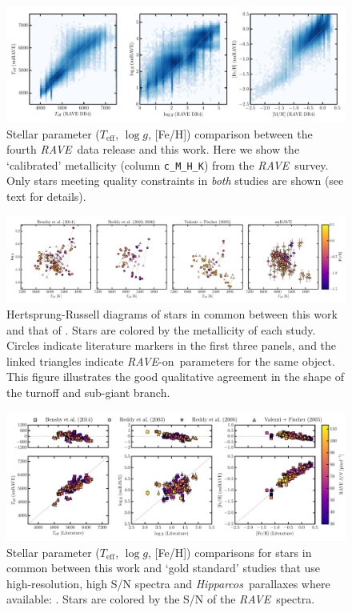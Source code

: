 \documentclass[preprint]{aastex}
\newcommand{\acronym}[1]{{\small{#1}}}
\newcommand{\project}[1]{\textsl{#1}}
\newcommand{\rave}{\project{\acronym{RAVE}}}
\newcommand{\hipparcos}{\project{Hipparcos}}
\newcommand{\raveon}{\rave-on}
\newcommand{\teff}{T_{\mathrm{eff}}}
\newcommand{\logg}{\log g}
\begin{document}
\begin{figure}[p]
\includegraphics[width=\textwidth]{figures/dr4-comparison.pdf}
\caption{Stellar parameter ($\teff$, $\logg$, [Fe/H]) comparison between the fourth \rave\ data release \citep{Kordopatis_2013} and this work. Here we show the `calibrated' metallicity (column \texttt{c\_M\_H\_K}) from the \rave\ survey. Only stars meeting quality constraints in \emph{both} studies are shown (see text for details).\label{fig:rave-dr4-comparison}}
\end{figure}


\begin{figure}[p]
\includegraphics[width=\textwidth]{figures/gold-standard-hrd.pdf}
\caption{Hertsprung-Russell diagrams of stars in common between this work and that of \citet{Bensby_2014,Reddy_2003,Reddy_2006,Valenti_Fischer_2005}.  Stars are colored by the metallicity of each study. Circles indicate literature markers in the first three panels, and the linked triangles indicate \raveon\ parameters for the same object. This figure illustrates the good qualitative agreement in the shape of the turnoff and sub-giant branch.\label{fig:gold-standard-hrd}}
\end{figure}


\begin{figure}[p]
\includegraphics[width=\textwidth]{figures/gold-standard-comparison.pdf}
\caption{Stellar parameter ($\teff$, $\logg$, [Fe/H]) comparisons for stars in common between this work and `gold standard' studies that use high-resolution, high S/N spectra and \hipparcos\ parallaxes where available: \citet{Bensby_2014,Reddy_2003,Reddy_2006,Valenti_Fischer_2005}. Stars are colored by the S/N of the \rave\ spectra. \label{fig:gold-standard-comparison}}
\end{figure}
\end{document}
